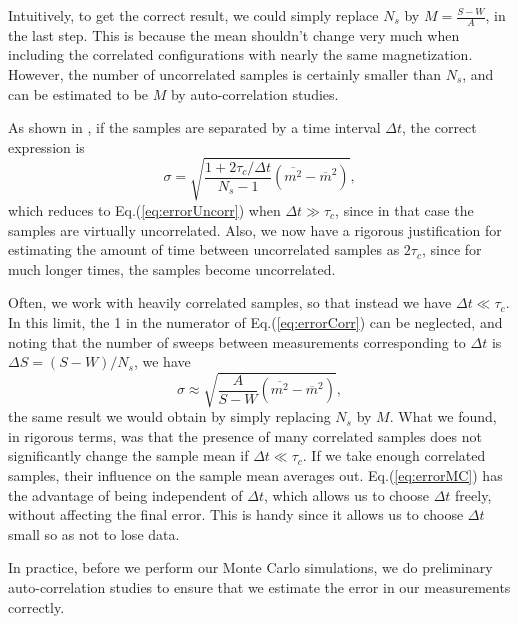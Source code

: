 Intuitively, to get the correct result, we could simply replace $N_s$ by $M = \frac{S - W}{A}$, in the last step.
This is because the mean shouldn't change very much when including the correlated configurations with nearly the same magnetization.
However, the number of uncorrelated samples is certainly smaller than $N_s$, and can be estimated to be $M$ by auto-correlation studies.

As shown in \cite{muller-krumbhaar_dynamic_1973}, if the samples are separated by a time interval $\Delta t$,  the correct expression is
\begin{equation}\label{eq:errorCorr}
\sigma = \sqrt{ \frac{1 + 2\tau_c / \Delta t}{N_s - 1} ( \overline{m^2} - \overline{m}^2 )  } ,
\end{equation}
which reduces to Eq.(\ref{eq:errorUncorr})  when $\Delta t \gg \tau_c$, since in that case the samples are virtually  uncorrelated.
Also, we now have a rigorous justification for estimating the amount of time between uncorrelated samples as $2\tau_c$, since for much longer times, the samples become uncorrelated.

Often, we work with heavily correlated samples, so that instead we have $\Delta t \ll \tau_c$.
In this limit, the 1 in the numerator of Eq.(\ref{eq:errorCorr}) can be neglected, and noting that the number of sweeps between measurements corresponding to $\Delta t$ is $\Delta S = (S - W ) / N_s$, we have
\begin{equation}\label{eq:errorMC}
\sigma \approx \sqrt{ \frac{A}{S - W} ( \overline{m^2} - \overline{m}^2 )  }  ,
\end{equation}
the same result we would obtain by simply replacing $N_s$ by $M$.
What we found, in rigorous terms, was that the presence of many correlated samples does not significantly change the sample mean if $\Delta t \ll \tau_c$.
If we take enough correlated samples, their influence on the sample mean averages out.
Eq.(\ref{eq:errorMC}) has the advantage of being independent of $\Delta t$, which allows us to choose $\Delta t$ freely, without affecting the final error.
This is handy since it allows us to choose $\Delta t$ small so as not to lose data.

In practice, before we perform our Monte Carlo simulations, we do preliminary auto-correlation studies to ensure that we estimate the error in our measurements correctly.